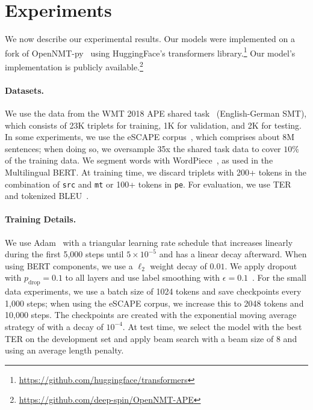 \section{Experiments} \label{sec:experiments}

We now describe our experimental results. Our models were implemented
on a fork of OpenNMT-py~\citep{klein2017opennmt} using HuggingFace's
transformers
library.\footnote{\url{https://github.com/huggingface/transformers}}
Our model's implementation is publicly
available.\footnote{\url{https://github.com/deep-spin/OpenNMT-APE}}

\paragraph*{Datasets.}
We use the data from the WMT 2018 APE shared
task~\citep{Chatterjee2018} (English-German SMT), which consists of
23K triplets for training, 1K for validation, and 2K for
testing. In some experiments, we use the eSCAPE
corpus~\citep{negri2018escape}, which comprises about 8M sentences;
when doing so, we oversample 35x the shared task data to cover $10\%$
of the training data. We segment words with
WordPiece~\citep{wu2016google}, as used in the
Multilingual BERT. At training time, we discard triplets with 200+
tokens in the combination of {\tt src} and {\tt mt} or 100+ tokens in
    {\tt pe}. For evaluation, we use TER~\citep{snover2006study} and
tokenized BLEU~\citep{papineni2002bleu}.

\paragraph*{Training Details.}
We use Adam~\citep{kingma2014adam} with a triangular learning rate
schedule that increases linearly during the first 5,000 steps until
$5\times 10^{-5}$ and has a linear decay afterward. When using BERT
components, we use a $\ell_2$ weight decay of $0.01$. We apply
dropout~\citep{srivastava2014dropout} with $p_{\text{drop}}\!=\!0.1$ to all
layers and use label smoothing with
$\epsilon\!=\!0.1$~\citep{pereyra2017regularizing}. For the small data
experiments, we use a batch size of 1024 tokens and save checkpoints
every 1,000 steps; when using the eSCAPE corpus, we increase this to
2048 tokens and 10,000 steps. The checkpoints are created with the
exponential moving average strategy of \citet{junczys2018marian}
with a decay of $10^{-4}$. At test time, we select the model with
the best TER on the development set and apply beam search with a beam
size of 8 and using an average length penalty.

